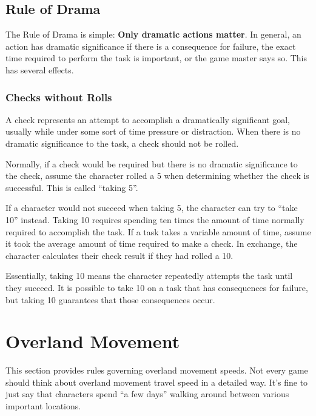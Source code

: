     \subsection{Rule of Drama}

        The Rule of Drama is simple: \textbf{Only dramatic actions matter}.
        In general, an action has dramatic significance if there is a consequence for failure, the exact time required to perform the task is important, or the game master says so.
        This has several effects.

        \subsubsection{Checks without Rolls}
            A check represents an attempt to accomplish a dramatically significant goal, usually while under some sort of time pressure or distraction.
            When there is no dramatic significance to the task, a check should not be rolled.

            \label{Taking 5}
            Normally, if a check would be required but there is no dramatic significance to the check, assume the character rolled a 5 when determining whether the check is successful.
            This is called ``taking 5''.

            \label{Taking 10}
            If a character would not succeed when taking 5, the character can try to ``take 10'' instead.
            Taking 10 requires spending ten times the amount of time normally required to accomplish the task.
            If a task takes a variable amount of time, assume it took the average amount of time required to make a check.
            In exchange, the character calculates their check result if they had rolled a 10.

            Essentially, taking 10 means the character repeatedly attempts the task until they succeed.
            It is possible to take 10 on a task that has consequences for failure, but taking 10 guarantees that those consequences occur.

\section{Overland Movement}\label{Overland Movement}

    This section provides rules governing overland movement speeds.
    Not every game should think about overland movement travel speed in a detailed way.
    It's fine to just say that characters spend ``a few days'' walking around between various important locations.

